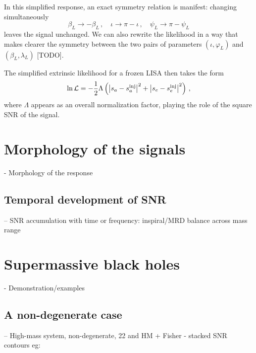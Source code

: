 \documentclass[aps,showpacs,twocolumn,prd,superscriptaddress,nofootinbib]{revtex4}
\newcommand{\be}{\begin{equation}}
\newcommand{\ee}{\end{equation}}
\newcommand\calL{{\mathcal{L}}}
\newcommand\betaL{{\beta_{L}}}
\newcommand\lambdaL{{\lambda_{L}}}
\newcommand\varphiL{{\varphi_{L}}}
\newcommand\psiL{{\psi_{L}}}
\newcommand{\SM}[1]{{\color{Blue} #1}}
\begin{document}
In this simplified response, an exact symmetry relation is manifest: changing simultaneously
\be\label{eq:symmetryresponse}
\betaL \rightarrow -\betaL\,, \quad \iota \rightarrow \pi - \iota \,, \quad \psiL \rightarrow \pi - \psiL
\ee
leaves the signal unchanged. We can also rewrite the likelihood in a way that makes clearer the symmetry between the two pairs of parameters $(\iota, \varphiL)$ and $(\betaL, \lambdaL)$ \SM{[TODO]}.

The simplified extrinsic likelihood for a frozen LISA then takes the form
\be\label{eq:simplelikelihood}
	\ln \calL = - \frac{1}{2} \Lambda \left( \left| s_{a} - s_{a}^{\rm inj} \right|^{2} + \left| s_{e} - s_{e}^{\rm inj} \right|^{2} \right) \,,
\ee
where $\Lambda$ appears as an overall normalization factor, playing the role of the square SNR of the signal.


\section{Morphology of the signals}
\label{sec:morph}

- Morphology of the response


\subsection{Temporal development of SNR}
\label{sec:timeSNR}

-- SNR accumulation with time or frequency: inspiral/MRD balance across mass range


\section{Supermassive black holes}
\label{sec:SMBH}

- Demonstration/examples


\subsection{A non-degenerate case}
\label{sec:high-M-non-deg}

-- High-mass system, non-degenerate, 22 and HM + Fisher - stacked SNR contours
eg:
\end{document}
